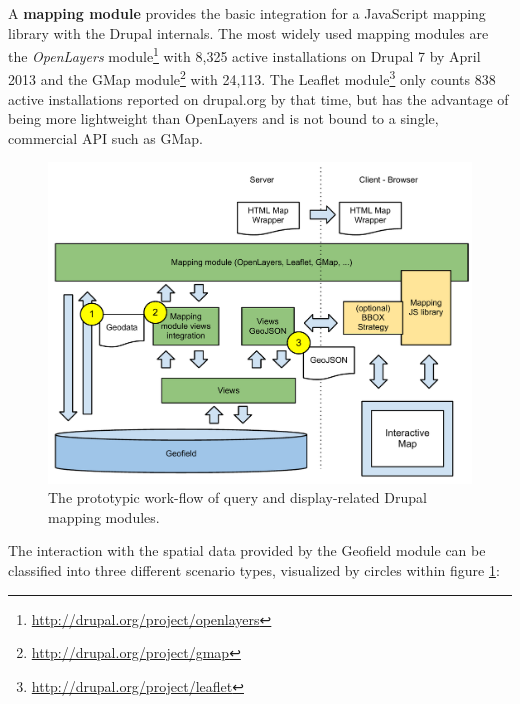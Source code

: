 A \textbf{mapping module} provides the basic integration for a JavaScript mapping library with the Drupal internals. The most widely used mapping modules are the \textit{OpenLayers} module\footnote{\url{http://drupal.org/project/openlayers}} with 8,325 active installations on Drupal 7 by April 2013 and the GMap module\footnote{\url{http://drupal.org/project/gmap}} with 24,113. The Leaflet module\footnote{\url{http://drupal.org/project/leaflet}} only counts 838 active installations reported on drupal.org by that time, but has the advantage of being more lightweight than OpenLayers and is not bound to a single, commercial API such as GMap.

\begin{figure}[h]
  \begin{center}
    \includegraphics[width=1\textwidth]{figures/drupal_mapping_display.pdf}
    \caption{The prototypic work-flow of query and display-related Drupal mapping modules.}
    \label{fig:drupal-mapping-display}
  \end{center}
\end{figure}

The interaction with the spatial data provided by the Geofield module can be classified into three different scenario types, visualized by circles within figure \ref{fig:drupal-mapping-display}:

